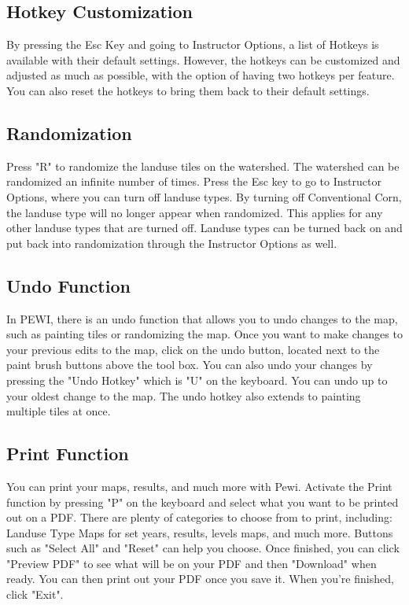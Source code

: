 \documentclass[11pt]{article}
\begin{document}
\begin{itemize}
\subsection{Hotkey Customization}
By pressing the Esc Key and going to Instructor Options, a list of Hotkeys is available with their default settings. However, the hotkeys can be customized and adjusted as much as possible, with the option of having two hotkeys per feature. You can also reset the hotkeys to bring them back to their default settings. 

\subsection{Randomization}
Press "R" to randomize the landuse tiles on the watershed. The watershed can be randomized an infinite number of times. Press the Esc key to go to Instructor Options, where you can turn off landuse types. By turning off Conventional Corn, the landuse type will no longer appear when randomized. This applies for any other landuse types that are turned off. Landuse types can be turned back on and put back into randomization through the Instructor Options as well. 

\subsection{Undo Function}
In PEWI, there is an undo function that allows you to undo changes to the map, such as painting tiles or randomizing the map. Once you want to make changes to your previous edits to the map, click on the undo button, located next to the paint brush buttons above the tool box. You can also undo your changes by pressing the "Undo Hotkey" which is "U" on the keyboard. You can undo up to your oldest change to the map. The undo hotkey also extends to painting multiple tiles at once. 

\subsection{Print Function}
You can print your maps, results, and much more with Pewi. Activate the Print function by pressing "P" on the keyboard and select what you want to be printed out on a PDF. There are plenty of categories to choose from to print, including: Landuse Type Maps for set years, results, levels maps, and much more. Buttons such as "Select All" and "Reset" can help you choose. Once finished, you can click "Preview PDF" to see what will be on your PDF and then "Download" when ready. You can then print out your PDF once you save it. When you're finished, click "Exit". 


\end{itemize}
\end{document}
